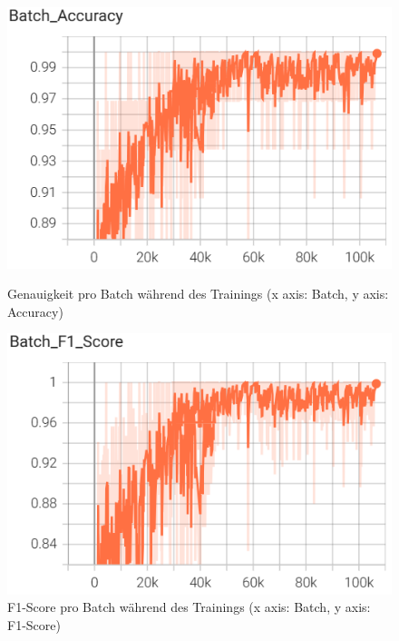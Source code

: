 \documentclass[11pt,a4paper]{article}
\begin{document}
\begin{figure}[H]
    \centering
    \begin{minipage}{0.48\textwidth}
        \includegraphics[width=\textwidth]{img/train/batch_accuracy.png}
        \caption{Genauigkeit pro Batch während des Trainings (x axis: Batch, y axis: Accuracy)}
        \label{fig:batch_accuracy}
    \end{minipage}\hfill
    \begin{minipage}{0.48\textwidth}
        \includegraphics[width=\textwidth]{img/train/batch_f1.png}
        \caption{F1-Score pro Batch während des Trainings (x axis: Batch, y axis: F1-Score)}
        \label{fig:batch_f1}
    \end{minipage}
\end{figure}
\end{document}
